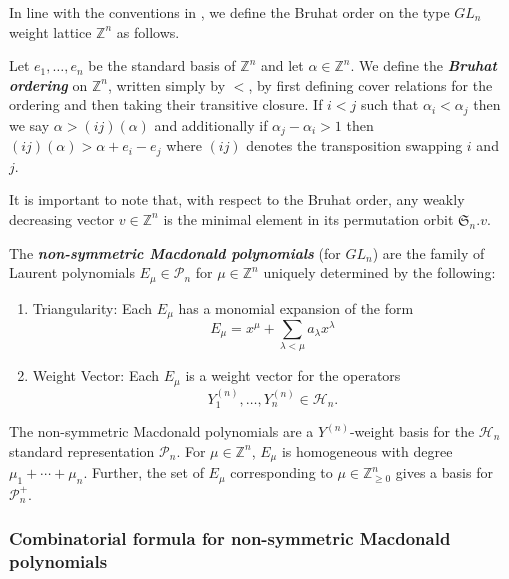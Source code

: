 \documentclass[ALCO,Unicode]{cedram}
\begin{document}
In line with the conventions in \cite{haglund2007combinatorial}, we define the Bruhat order on the type $GL_n$ weight lattice $\mathbb{Z}^{n}$ as follows. 

\begin{defi}
Let $e_1,\ldots,e_n$ be the standard basis of $\mathbb{Z}^n$ and let $\alpha \in \mathbb{Z}^n$. We define the\textbf{\textit{ Bruhat ordering}} on $\mathbb{Z}^n$, written simply by $<$, by first defining cover relations for the ordering and then taking their transitive closure. If $i<j$ such that $\alpha_i < \alpha_j$ then we say $\alpha > (ij)(\alpha)$ and additionally if $\alpha_j - \alpha_i > 1$ then $(ij)(\alpha) > \alpha + e_i - e_j$ where $(ij)$ denotes the transposition swapping $i$ and $j.$
\end{defi}

It is important to note that, with respect to the Bruhat order, any weakly decreasing vector $v \in \mathbb{Z}^n$ is the minimal element in its permutation orbit $\mathfrak{S}_n.v$.


\begin{defi} \label{defn3}
The \textbf{\textit{non-symmetric Macdonald polynomials}} (for $GL_n$) are the family of Laurent polynomials $E_{\mu} \in \mathscr{P}_n$ for $\mu \in \mathbb{Z}^n$ uniquely determined by the following:

\begin{enumerate}
    \item Triangularity: Each $E_{\mu}$ has a monomial expansion of the form $$E_{\mu} = x^{\mu} + \sum_{\lambda < \mu} a_{\lambda}x^{\lambda}$$
    
    
    \item Weight Vector: Each  $E_{\mu}$ is a weight vector for the operators $$Y_1^{(n)},\ldots,Y_n^{(n)} \in \mathscr{H}_n.$$
\end{enumerate}
\end{defi}

The non-symmetric Macdonald polynomials are a $Y^{(n)}$-weight basis for the $\mathscr{H}_n$ standard representation $\mathscr{P}_n$. For $\mu \in \mathbb{Z}^n$, $E_{\mu}$ is homogeneous with degree $\mu_1+\cdots +\mu_n$. Further, the set of $E_{\mu}$ corresponding to $\mu \in \mathbb{Z}_{\geq 0}^n$ gives a basis for $\mathscr{P}_n ^{+}$.

\subsubsection{Combinatorial formula for non-symmetric Macdonald polynomials}
\end{document}

